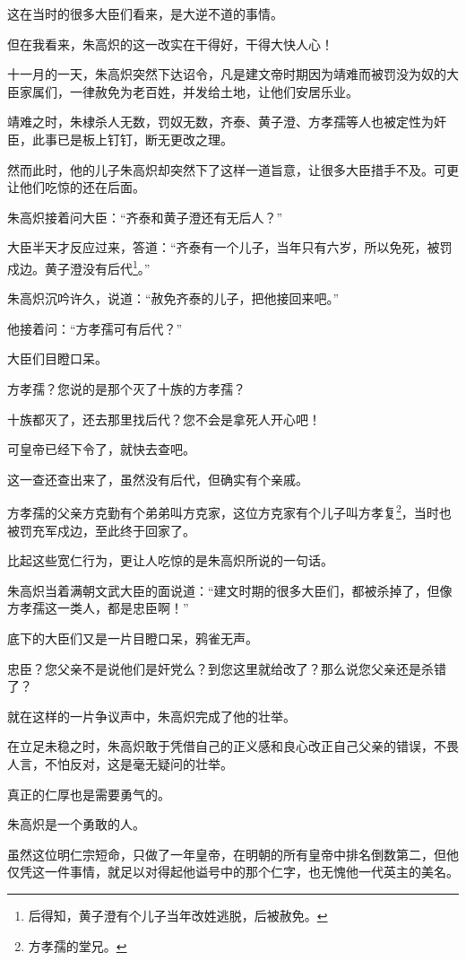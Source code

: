 \begin{multicols}{\theparacolNo}
这在当时的很多大臣们看来，是大逆不道的事情。

但在我看来，朱高炽的这一改实在干得好，干得大快人心！

十一月的一天，朱高炽突然下达诏令，凡是建文帝时期因为靖难而被罚没为奴的大臣家属们，一律赦免为老百姓，并发给土地，让他们安居乐业。

靖难之时，朱棣杀人无数，罚奴无数，齐泰、黄子澄、方孝孺等人也被定性为奸臣，此事已是板上钉钉，断无更改之理。

然而此时，他的儿子朱高炽却突然下了这样一道旨意，让很多大臣措手不及。可更让他们吃惊的还在后面。

朱高炽接着问大臣：“齐泰和黄子澄还有无后人？”

大臣半天才反应过来，答道：“齐泰有一个儿子，当年只有六岁，所以免死，被罚戍边。黄子澄没有后代\footnote{后得知，黄子澄有个儿子当年改姓逃脱，后被赦免。}。”

朱高炽沉吟许久，说道：“赦免齐泰的儿子，把他接回来吧。”

他接着问：“方孝孺可有后代？”

大臣们目瞪口呆。

方孝孺？您说的是那个灭了十族的方孝孺？

十族都灭了，还去那里找后代？您不会是拿死人开心吧！

可皇帝已经下令了，就快去查吧。

这一查还查出来了，虽然没有后代，但确实有个亲戚。

方孝孺的父亲方克勤有个弟弟叫方克家，这位方克家有个儿子叫方孝复\footnote{方孝孺的堂兄。}，当时也被罚充军戍边，至此终于回家了。

比起这些宽仁行为，更让人吃惊的是朱高炽所说的一句话。

朱高炽当着满朝文武大臣的面说道：“建文时期的很多大臣们，都被杀掉了，但像方孝孺这一类人，都是忠臣啊！”

底下的大臣们又是一片目瞪口呆，鸦雀无声。

忠臣？您父亲不是说他们是奸党么？到您这里就给改了？那么说您父亲还是杀错了？

就在这样的一片争议声中，朱高炽完成了他的壮举。

在立足未稳之时，朱高炽敢于凭借自己的正义感和良心改正自己父亲的错误，不畏人言，不怕反对，这是毫无疑问的壮举。

真正的仁厚也是需要勇气的。

朱高炽是一个勇敢的人。

虽然这位明仁宗短命，只做了一年皇帝，在明朝的所有皇帝中排名倒数第二，但他仅凭这一件事情，就足以对得起他谥号中的那个仁字，也无愧他一代英主的美名。


\end{multicols}
